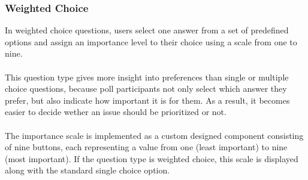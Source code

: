 \documentclass[a4paper,12pt]{report}
\begin{document}
\subsubsection{Weighted Choice}
In weighted choice questions, users select one answer from a set of predefined options and assign an importance level to their choice using a scale from one to nine.\\\\
This question type gives more insight into preferences than single or multiple choice questions, because poll participants not only select which answer they prefer, but also indicate how important it is for them. As a result, it becomes easier to decide wether an issue should be prioritized or not.\\\\
The importance scale is implemented as a custom designed component consisting of nine buttons, each representing a value from one (least important) to nine (most important). If the question type is weighted choice, this scale is displayed along with the standard single choice option.\\
\end{document}
